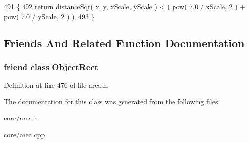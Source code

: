 \begin{DoxyCode}
491 \{
492     \textcolor{keywordflow}{return} \hyperlink{classOkular_1_1ObjectRect_a9e1f6727b141e7cb86529dbc55120e81}{distanceSqr}( x, y, xScale, yScale ) < ( pow( 7.0 / xScale, 2 ) + pow( 7.0 / yScale, 2
       ) );
493 \}
\end{DoxyCode}


\subsection{Friends And Related Function Documentation}
\hypertarget{classOkular_1_1SourceRefObjectRect_ae6167dbefdc7f5fd8f1425f4d036da82}{
\subsubsection[{Object\+Rect}]{\setlength{\rightskip}{0pt plus 5cm}friend class {\bf Object\+Rect}\hspace{0.3cm}{\ttfamily [friend]}}}\label{classOkular_1_1SourceRefObjectRect_ae6167dbefdc7f5fd8f1425f4d036da82}


Definition at line 476 of file area.\+h.



The documentation for this class was generated from the following files\+:\begin{DoxyCompactItemize}
\item 
core/\hyperlink{area_8h}{area.\+h}\item 
core/\hyperlink{area_8cpp}{area.\+cpp}\end{DoxyCompactItemize}
